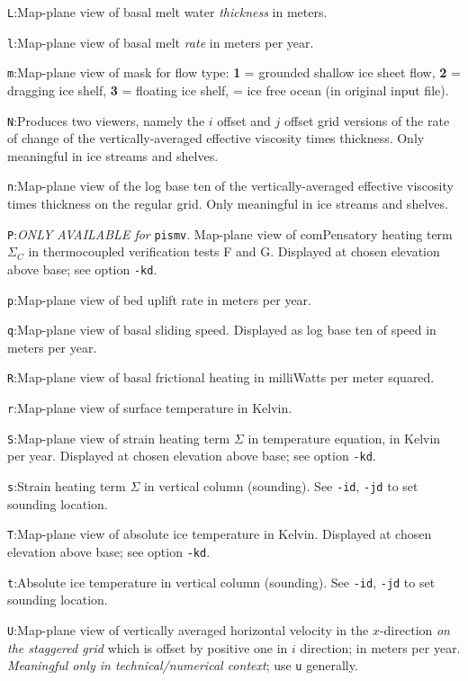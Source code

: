 \documentclass[11pt,final]{amsart}
\renewcommand{\t}[1]{\texttt{#1}}
\begin{document}
\verb|L|:\quad Map-plane view of basal melt water \emph{thickness} in meters.

\verb|l|:\quad Map-plane view of basal melt \emph{rate} in meters per year.

\verb|m|:\quad Map-plane view of mask for flow type:  \textbf{1} = grounded shallow ice sheet flow,  \textbf{2} = dragging ice shelf, \textbf{3} = floating ice shelf,  = ice free ocean (in original input file).

\verb|N|:\quad Produces two viewers, namely the $i$ offset and $j$ offset grid versions of the rate of change of the vertically-averaged effective viscosity times thickness.  Only meaningful in ice streams and shelves.

\verb|n|:\quad Map-plane view of the log base ten of the vertically-averaged effective viscosity times thickness on the regular grid.  Only meaningful in ice streams and shelves.

\verb|P|:\quad \emph{ONLY AVAILABLE for }\t{pismv}.  Map-plane view of comPensatory heating term $\Sigma_C$ in thermocoupled verification tests F and G.  Displayed at chosen elevation above base; see option \verb|-kd|.

\verb|p|:\quad Map-plane view of bed uplift rate in meters per year.

\verb|q|:\quad Map-plane view of basal sliding speed.  Displayed as log base ten of speed in meters per year.

\verb|R|:\quad Map-plane view of basal frictional heating in milliWatts per meter squared.

\verb|r|:\quad Map-plane view of surface temperature in Kelvin.

\verb|S|:\quad Map-plane view of strain heating term $\Sigma$ in temperature equation, in Kelvin per year.  Displayed at chosen elevation above base; see option \verb|-kd|.

\verb|s|:\quad Strain heating term $\Sigma$ in vertical column (sounding).  See \verb|-id|, \verb|-jd| to set sounding location.

\verb|T|:\quad Map-plane view of absolute ice temperature in Kelvin.  Displayed at chosen elevation above base; see option \verb|-kd|.

\verb|t|:\quad Absolute ice temperature in vertical column (sounding).  See \verb|-id|, \verb|-jd| to set sounding location.

\verb|U|:\quad Map-plane view of vertically averaged horizontal velocity in the $x$-direction \emph{on the staggered grid} which is offset by positive one in $i$ direction;  in meters per year.  \emph{Meaningful only in technical/numerical context}; use \verb|u| generally.
\end{document}
